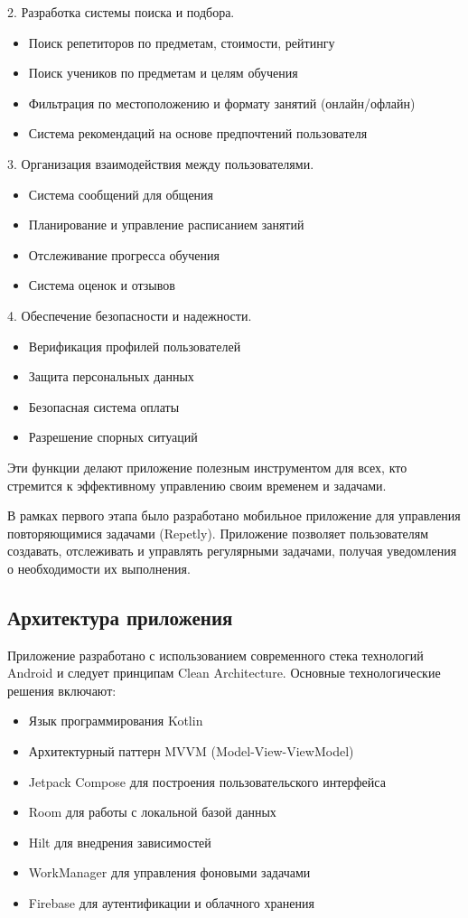 \documentclass[14pt, russian]{scrartcl}
\begin{document}
2. Разработка системы поиска и подбора.
   \begin{itemize}
   \item Поиск репетиторов по предметам, стоимости, рейтингу
   \item Поиск учеников по предметам и целям обучения
   \item Фильтрация по местоположению и формату занятий (онлайн/офлайн)
   \item Система рекомендаций на основе предпочтений пользователя
   \end{itemize}

3. Организация взаимодействия между пользователями.
   \begin{itemize}
   \item Система сообщений для общения
   \item Планирование и управление расписанием занятий
   \item Отслеживание прогресса обучения
   \item Система оценок и отзывов
   \end{itemize}

4. Обеспечение безопасности и надежности.
   \begin{itemize}
   \item Верификация профилей пользователей
   \item Защита персональных данных
   \item Безопасная система оплаты
   \item Разрешение спорных ситуаций
   \end{itemize}

Эти функции делают приложение полезным инструментом для всех, кто стремится к эффективному управлению своим временем и задачами.

В рамках первого этапа было разработано мобильное приложение для управления повторяющимися задачами (Repetly). Приложение позволяет пользователям создавать, отслеживать и управлять регулярными задачами, получая уведомления о необходимости их выполнения.

\subsection{Архитектура приложения}\label{sect:architecture}

Приложение разработано с использованием современного стека технологий Android и следует принципам Clean Architecture. Основные технологические решения включают:

\begin{itemize}
\item Язык программирования Kotlin
\item Архитектурный паттерн MVVM (Model-View-ViewModel)
\item Jetpack Compose для построения пользовательского интерфейса
\item Room для работы с локальной базой данных
\item Hilt для внедрения зависимостей
\item WorkManager для управления фоновыми задачами
\item Firebase для аутентификации и облачного хранения
\end{itemize}
\end{document}
